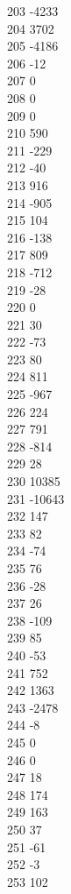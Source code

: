 { 203	-4233 \\
 204	3702 \\
 205	-4186 \\
 206	-12 \\
 207	0 \\
 208	0 \\
 209	0 \\
 210	590 \\
 211	-229 \\
 212	-40 \\
 213	916 \\
 214	-905 \\
 215	104 \\
 216	-138 \\
 217	809 \\
 218	-712 \\
 219	-28 \\
 220	0 \\
 221	30 \\
 222	-73 \\
 223	80 \\
 224	811 \\
 225	-967 \\
 226	224 \\
 227	791 \\
 228	-814 \\
 229	28 \\
 230	10385 \\
 231	-10643 \\
 232	147 \\
 233	82 \\
 234	-74 \\
 235	76 \\
 236	-28 \\
 237	26 \\
 238	-109 \\
 239	85 \\
 240	-53 \\
 241	752 \\
 242	1363 \\
 243	-2478 \\
 244	-8 \\
 245	0 \\
 246	0 \\
 247	18 \\
 248	174 \\
 249	163 \\
 250	37 \\
 251	-61 \\
 252	-3 \\
 253	102 \\
}
